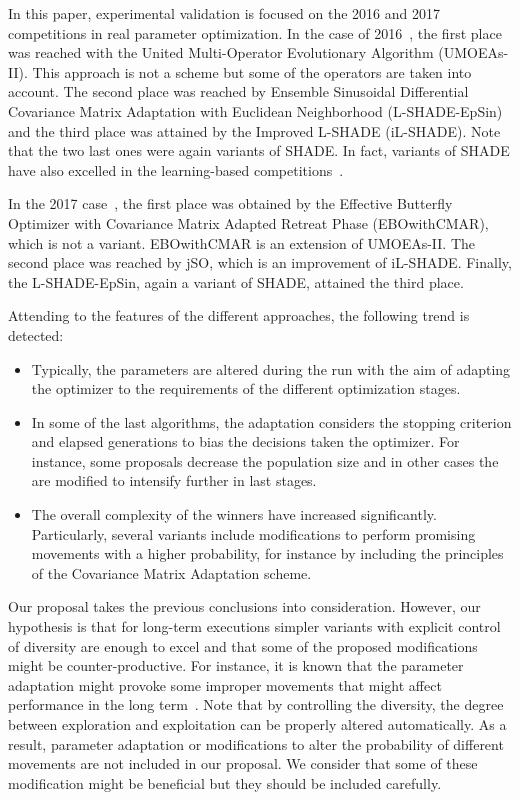 In this paper, experimental validation is focused on the \CEC{} 2016 and \CEC{} 2017 competitions in real parameter optimization.
%
In the case of 2016~\cite{CEC2015}, the first place was reached with the United Multi-Operator Evolutionary Algorithm (UMOEAs-II).
%
This approach is not a \DE{} scheme but some of the \DE{} operators are taken into account.
%
The second place was reached by Ensemble Sinusoidal Differential Covariance Matrix Adaptation with Euclidean Neighborhood (L-SHADE-EpSin) 
and the third place was attained by the Improved L-SHADE (iL-SHADE).
%
Note that the two last ones were again variants of SHADE.
%
In fact, variants of SHADE have also excelled in the learning-based competitions~\cite{CEC2016_learn}.

In the \CEC{} 2017 case~\cite{CEC2017}, the first place was obtained by the Effective Butterfly Optimizer with Covariance 
Matrix Adapted Retreat Phase (EBOwithCMAR), which is not a \DE{} variant.
%
EBOwithCMAR is an extension of UMOEAs-II.
%
The second place was reached by jSO, which is an improvement of iL-SHADE.
%
Finally, the L-SHADE-EpSin, again a variant of SHADE, attained the third place.

Attending to the features of the different approaches, the following trend is detected:

\begin{itemize}
	\item Typically, the parameters are altered during the run with the aim of adapting the optimizer to the requirements of the different optimization stages. 
	\item In some of the last algorithms, the adaptation considers the stopping criterion and elapsed generations to bias the decisions taken the optimizer.
	For instance, some proposals decrease the population size and in other cases the \DE{} are modified to intensify further in last stages.
	\item The overall complexity of the winners have increased significantly. Particularly, several variants include modifications to perform promising
	movements with a higher probability, for instance by including the principles of the Covariance Matrix Adaptation scheme.
\end{itemize}

Our proposal takes the previous conclusions into consideration.
%
However, our hypothesis is that for long-term executions simpler variants with explicit control of diversity are enough to excel and 
that some of the proposed modifications might be counter-productive.
%
For instance, it is known that the parameter adaptation might provoke some improper movements that might affect performance in the
long term~\cite{montgomery2010analysis}.
%
Note that by controlling the diversity, the degree between exploration and exploitation can be properly altered automatically.
%
As a result, parameter adaptation or modifications to alter the probability of different movements are not included in our proposal.
%
We consider that some of these modification might be beneficial but they should be included carefully.


